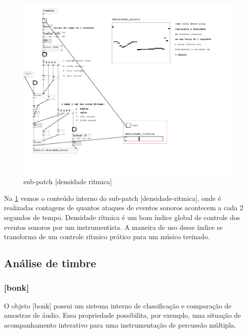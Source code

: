 \documentclass{ppgmus}
\begin{document}
\begin{figure}
\includegraphics[scale=.75]{prot5c}
\caption{sub-patch [densidade ritmica]}
\label{prot5c}
\end{figure}


Na \ref{prot5c} vemos o conteúdo interno do sub-patch [densidade-ritmica], onde é realizadas
contagens de quantos ataques de eventos sonoros acontecem a cada 2 segundos de tempo.
Densidade rítmica é um bom índice global de controle dos eventos sonoros por um instrumentista.
A maneira de uso desse índice se transforma de um controle rítmico prático para um
músico treinado.





\subsection{Análise de timbre}


\subsubsection{[bonk\texttildelow]}


O objeto [bonk\texttildelow] possui um sistema interno de classificação
e comparação de amostras de áudio. Essa propriedade possibilita, por exemplo, 
uma situação de acompanhamento interativo para uma instrumentação de 
percussão múltipla.
\end{document}
